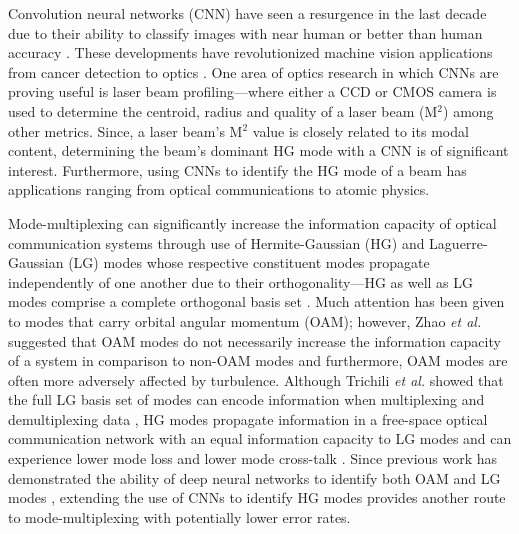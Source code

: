 \documentclass[10pt,journal,compsoc]{IEEEtran}
\begin{document}

Convolution neural networks (CNN) \cite{lecun1998gradient} have seen a resurgence in the last decade \cite{Krizhevsky2012} due to their ability to classify images with near human or better than human accuracy \cite{he2015delving}. These developments have revolutionized machine vision applications from cancer detection \cite{cirecsan2013mitosis} to optics \cite{dosovitskiy2015flownet}. One area of optics research in which CNNs are proving useful \cite{lin2018application} is laser beam profiling—where either a CCD or CMOS camera is used to determine the centroid, radius \cite{hofer2017scale} and quality of a laser beam (M$^2$) among other metrics. Since, a laser beam's M$^2$ value is closely related to its modal content, determining the beam's dominant HG mode with a CNN is of significant interest. Furthermore, using CNNs to identify the HG \cite{kogelnik1966laser} mode of a beam has applications ranging from optical communications to atomic physics. 

Mode-multiplexing can significantly increase the information capacity of optical communication systems\cite{bozinovic2013terabit, wang2012terabit} through use of Hermite-Gaussian (HG) and Laguerre-Gaussian (LG) modes whose respective constituent modes propagate independently of one another due to their orthogonality---HG as well as LG modes comprise a complete orthogonal basis set \cite{lasers}. Much attention has been given to modes that carry orbital angular momentum (OAM); however, Zhao \textit{et al.} suggested that OAM modes do not necessarily increase the information capacity of a system in comparison to non-OAM modes and furthermore, OAM modes are often more adversely affected by turbulence\cite{zhao2015capacity}. Although Trichili \textit{et al.} showed that the full LG basis set of modes can encode information when multiplexing and demultiplexing data \cite{Trichili2016}, HG modes propagate information in a free-space optical communication network with an equal information capacity \cite{chen2016there} to LG modes and can experience lower mode loss and lower mode cross-talk \cite{Ndagano2017, cox2019resilience}. Since previous work has demonstrated the ability of deep neural networks to identify both OAM \cite{Krenn2014, Krenn2016, Doster2017, tian2018turbo} and LG modes \cite{Lohani2018}, extending the use of CNNs to identify HG modes provides another route to mode-multiplexing with potentially lower error rates. 
\end{document}
